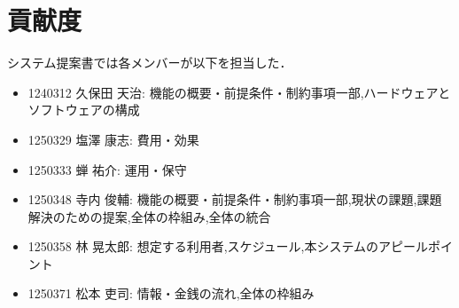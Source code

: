 \documentclass[a4paper, titlepage]{jsarticle}
\begin{document}
\section{貢献度}
システム提案書では各メンバーが以下を担当した．
\begin{itemize}
  \item 1240312 久保田 天治: 機能の概要・前提条件・制約事項一部,ハードウェアとソフトウェアの構成
  \item 1250329 塩澤 康志: 費用・効果
  \item 1250333 蝉 祐介: 運用・保守
  \item 1250348 寺内 俊輔: 機能の概要・前提条件・制約事項一部,現状の課題,課題解決のための提案,全体の枠組み,全体の統合
  \item 1250358 林 晃太郎: 想定する利用者,スケジュール,本システムのアピールポイント
  \item 1250371 松本 吏司: 情報・金銭の流れ,全体の枠組み
\end{itemize}


\end{document}
